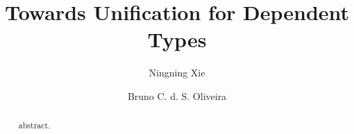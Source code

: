 \documentclass[oribibl, citeauthoryear]{llncs}
\author{Ningning Xie \and Bruno C. d. S. Oliveira}
\institute{The University of Hong Kong}
\begin{document}
\setlength{\pdfpageheight}{\paperheight}
\setlength{\pdfpagewidth}{\paperwidth}


\title{Towards Unification for Dependent Types}
\maketitle

\begin{abstract}
  abstract.
\end{abstract}











\newpage
\appendix



\end{document}
